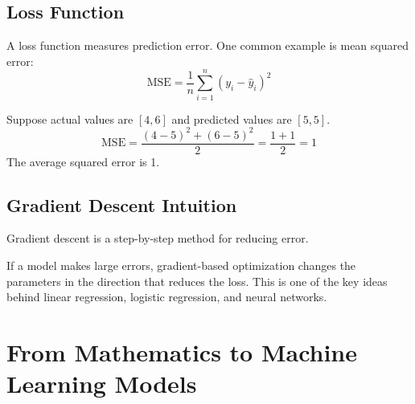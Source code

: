 \documentclass[11pt,a4paper]{article}
\begin{document}
\subsection{Loss Function}

A loss function measures prediction error. One common example is mean squared error:
\[
\text{MSE} = \frac{1}{n}\sum_{i=1}^{n}(y_i - \hat{y}_i)^2
\]

\begin{examplebox}
Suppose actual values are $[4, 6]$ and predicted values are $[5, 5]$.
\[
\text{MSE} = \frac{(4-5)^2 + (6-5)^2}{2} = \frac{1 + 1}{2} = 1
\]
The average squared error is 1.
\end{examplebox}

\subsection{Gradient Descent Intuition}

Gradient descent is a step-by-step method for reducing error.

\begin{center}
\end{center}

\begin{conceptbox}
If a model makes large errors, gradient-based optimization changes the parameters in the direction that reduces the loss. This is one of the key ideas behind linear regression, logistic regression, and neural networks.
\end{conceptbox}

\section{From Mathematics to Machine Learning Models}
\end{document}
